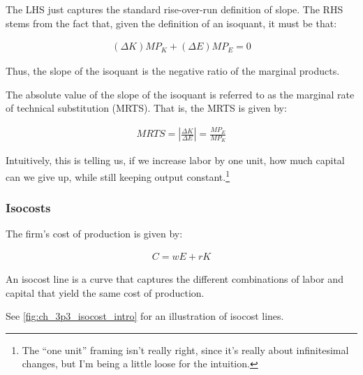 The LHS just captures the standard rise-over-run 
definition of slope. The RHS stems from the fact that,
given the definition of an isoquant,
it must be that:

\begin{align}
    (\Delta K) MP_K + (\Delta E) MP_E = 0
\end{align}

Thus, the slope of the isoquant is the 
negative ratio of the marginal products.

\begin{definition}
    
    The absolute value of the slope of the 
    isoquant is referred to as the marginal rate of technical substitution (MRTS).
    That is, the MRTS is given by:

    \begin{align}
        MRTS = \left| \frac{\Delta K}{\Delta E} \right| = \frac{M P_E}{M P_K}
    \end{align}

    Intuitively, this is telling us, if we increase labor by one unit, 
    how much capital can we give up, while still keeping output constant.\footnote{
        The ``one unit'' framing isn't really right, since it's 
        really about infinitesimal changes, but
        I'm being a little loose for the intuition.
    }
    
\end{definition}

\subsubsection{Isocosts}

The firm's cost of production is given by:

\begin{align}
    C=w E+r K
\end{align}

\begin{definition} 
    
    An isocost line is a curve that captures the 
    different combinations of labor and capital
    that yield the same cost of production.

\end{definition}

See \autoref{fig:ch_3p3_isocost_intro}
for an illustration of isocost lines.


